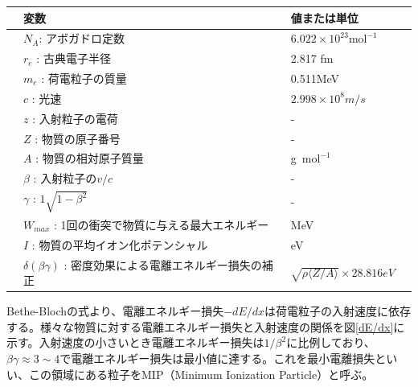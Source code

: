 \begin{table}[H]
 \label{table:bethe}
 \centering
  \begin{tabular}{clll}
   \hline \hline
   &変数 & 値または単位 \\
   \hline
&$N_A $: アボガドロ定数 & $6.022 \times 10^23 {\si{\mol}}^{-1}$\\
&$r_e$ : 古典電子半径&2.817 fm\\ 
&$m_e$ : 荷電粒子の質量 &0.511MeV\\
&$c$ : 光速 & $2.998 \times 10^8 m/s$\\
&$z$ : 入射粒子の電荷& - \\
&$Z$ : 物質の原子番号 & - \\
&$A$ : 物質の相対原子質量 & g\ ${\si{\mol}}^{-1}$ \\
&$\beta$ : 入射粒子の$v/c$ & - \\
&$\gamma$ : $1\sqrt{1-{\beta}^2}$ & - \\
&$W_{max}$ : 1回の衝突で物質に与える最大エネルギー & MeV\\
&$I$ : 物質の平均イオン化ポテンシャル &eV\\
&$\delta(\beta \gamma)$ : 密度効果による電離エネルギー損失の補正 & $\sqrt{\rho \langle Z/A\rangle } \times 28.816eV$\\
  \end{tabular}
\end{table}
Bethe-Blochの式より、電離エネルギー損失$-dE/dx$は荷電粒子の入射速度に依存する。様々な物質に対する電離エネルギー損失と入射速度の関係を図\ref{dE/dx}に示す。入射速度の小さいとき電離エネルギー損失は$1/{\beta}^2$に比例しており、$\beta \gamma  \approx 3 \sim 4$で電離エネルギー損失は最小値に達する。これを最小電離損失といい、この領域にある粒子をMIP（Minimum Ionization Particle）と呼ぶ。
